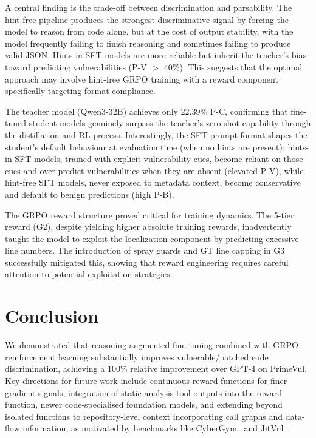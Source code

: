 \documentclass{article}
\begin{document}
A central finding is the trade-off between discrimination and parsability. The hint-free pipeline produces the strongest discriminative signal by forcing the model to reason from code alone, but at the cost of output stability, with the model frequently failing to finish reasoning and sometimes failing to produce valid JSON. Hints-in-SFT models are more reliable but inherit the teacher's bias toward predicting vulnerabilities (P-V $>$ 40\%). This suggests that the optimal approach may involve hint-free GRPO training with a reward component specifically targeting format compliance.

The teacher model (Qwen3-32B) achieves only 22.39\% P-C, confirming that fine-tuned student models genuinely surpass the teacher's zero-shot capability through the distillation and RL process. Interestingly, the SFT prompt format shapes the student's default behaviour at evaluation time (when no hints are present): hints-in-SFT models, trained with explicit vulnerability cues, become reliant on those cues and over-predict vulnerabilities when they are absent (elevated P-V), while hint-free SFT models, never exposed to metadata context, become conservative and default to benign predictions (high P-B).

The GRPO reward structure proved critical for training dynamics. The 5-tier reward (G2), despite yielding higher absolute training rewards, inadvertently taught the model to exploit the localization component by predicting excessive line numbers. The introduction of spray guards and GT line capping in G3 successfully mitigated this, showing that reward engineering requires careful attention to potential exploitation strategies.

\section{Conclusion}

We demonstrated that reasoning-augmented fine-tuning combined with GRPO reinforcement learning substantially improves vulnerable/patched code discrimination, achieving a 100\% relative improvement over GPT-4 on PrimeVul. Key directions for future work include continuous reward functions for finer gradient signals, integration of static analysis tool outputs into the reward function, newer code-specialised foundation models, and extending beyond isolated functions to repository-level context incorporating call graphs and data-flow information, as motivated by benchmarks like CyberGym~\cite{cybergym} and JitVul~\cite{jitvul}.
\end{document}
